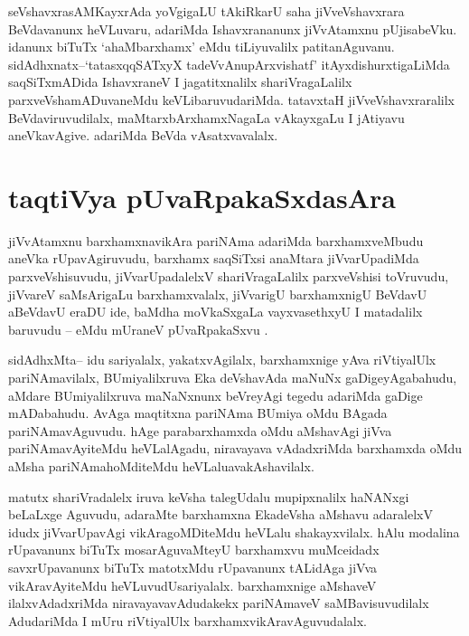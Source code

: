 \begin{artha}
seVshavxrasAMKayxrAda yoVgigaLU tAkiRkarU saha jiVveVshavxrara
BeVdavanunx heVLuvaru, adariMda Ishavxrananunx jiVvAtamxnu
pUjisabeVku. idanunx biTuTx `ahaMbarxhamx' eMdu tiLiyuvalilx
patitanAguvanu. sidAdhxnatx--`tatasxqqSATxyX tadeVvAnupArxvishatf'
itAyxdishurxtigaLiMda saqSiTxmADida IshavxraneV I jagatitxnalilx
shariVragaLalilx parxveVshamADuvaneMdu keVLibaruvudariMda. tatavxtaH
jiVveVshavxraralilx BeVdaviruvudilalx, maMtarxbArxhamxNagaLa
vAkayxgaLu I jAtiyavu aneVkavAgive. adariMda BeVda vAsatxvavalalx. 
\end{artha}

\section*{taqtiVya pUvaRpakaSxdasAra}

\begin{artha}
jiVvAtamxnu barxhamxnavikAra pariNAma adariMda barxhamxveMbudu aneVka rUpavAgiruvudu, barxhamx saqSiTxsi anaMtara jiVvarUpadiMda parxveVshisuvudu, jiVvarUpadalelxV shariVragaLalilx parxveVshisi toVruvudu, jiVvareV  saMsArigaLu barxhamxvalalx, jiVvarigU barxhamxnigU BeVdavU aBeVdavU eraDU ide, baMdha moVkaSxgaLa vayxvasethxyU I matadalilx baruvudu -- eMdu mUraneV pUvaRpakaSxvu .
\end{artha}

\begin{artha}
sidAdhxMta-- idu sariyalalx, yakatxvAgilalx, barxhamxnige yAva
riVtiyalUlx  pariNAmavilalx, BUmiyalilxruva Eka deVshavAda maNuNx
gaDigeyAgabahudu, aMdare BUmiyalilxruva maNaNxnunx beVreyAgi tegedu
adariMda gaDige mADabahudu. AvAga maqtitxna pariNAma BUmiya oMdu
BAgada pariNAmavAguvudu. hAge parabarxhamxda oMdu aMshavAgi jiVva
pariNAmavAyiteMdu heVLalAgadu, niravayava vAdadxriMda barxhamxda oMdu
aMsha pariNAmahoMditeMdu heVLaluavakAshavilalx.
\end{artha}

\begin{artha}
matutx shariVradalelx iruva keVsha talegUdalu mupipxnalilx haNANxgi
beLaLxge Aguvudu, adaraMte  barxhamxna EkadeVsha aMshavu adaralelxV
idudx jiVvarUpavAgi vikAragoMDiteMdu heVLalu shakayxvilalx. hAlu
modalina rUpavanunx biTuTx mosarAguvaMteyU barxhamxvu muMceidadx
savxrUpavanunx biTuTx matotxMdu rUpavanunx tALidAga jiVva
vikAravAyiteMdu heVLuvudUsariyalalx. barxhamxnige aMshaveV
ilalxvAdadxriMda niravayavavAdudakekx pariNAmaveV saMBavisuvudilalx
AdudariMda I mUru riVtiyalUlx barxhamxvikAravAguvudalalx.
\end{artha}

